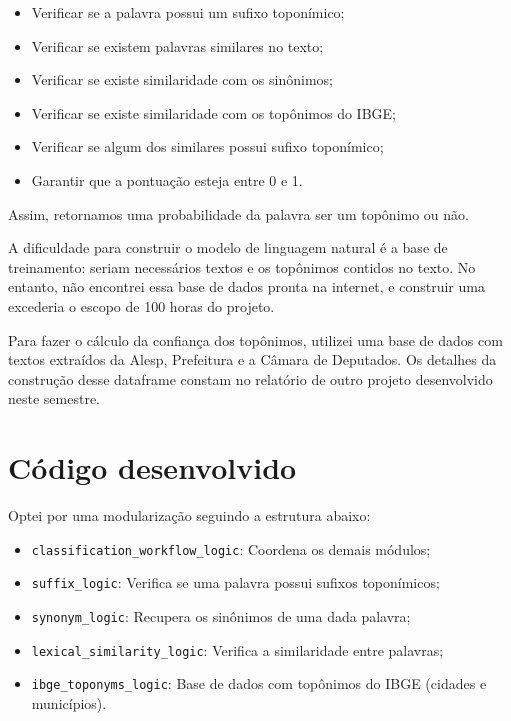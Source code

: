 \documentclass{article}
\begin{document}
\begin{itemize}
    \item Verificar se a palavra possui um sufixo toponímico;
    \item Verificar se existem palavras similares no texto;
    \item Verificar se existe similaridade com os sinônimos;
    \item Verificar se existe similaridade com os topônimos do IBGE;
    \item Verificar se algum dos similares possui sufixo toponímico;
    \item Garantir que a pontuação esteja entre 0 e 1.
\end{itemize}

Assim, retornamos uma probabilidade da palavra ser um topônimo ou não.

A dificuldade para construir o modelo de linguagem natural é a base de treinamento: seriam necessários textos e os topônimos contidos no texto. No entanto, não encontrei essa base de dados pronta na internet, e construir uma excederia o escopo de 100 horas do projeto.

Para fazer o cálculo da confiança dos topônimos, utilizei uma base de dados com textos extraídos da Alesp, Prefeitura e a Câmara de Deputados. Os detalhes da construção desse dataframe constam no relatório de outro projeto desenvolvido neste semestre.

\section*{Código desenvolvido}
Optei por uma modularização seguindo a estrutura abaixo:
\begin{itemize}
    \item \texttt{classification\_workflow\_logic}: Coordena os demais módulos;
    \item \texttt{suffix\_logic}: Verifica se uma palavra possui sufixos toponímicos;
    \item \texttt{synonym\_logic}: Recupera os sinônimos de uma dada palavra;
    \item \texttt{lexical\_similarity\_logic}: Verifica a similaridade entre palavras;
    \item \texttt{ibge\_toponyms\_logic}: Base de dados com topônimos do IBGE (cidades e municípios).
\end{itemize}
\end{document}
